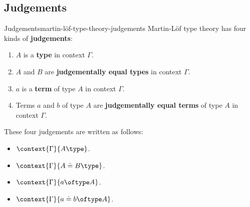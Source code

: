 \subsection{Judgements}\label{subsection-martin-löf-type-theory-judgements}
\begin{definition}{Judgements}{martin-löf-type-theory-judgements}%
    Martin-Löf type theory has four kinds of \textbf{judgements}:
    \begin{enumerate}
        \item\label{martin-löf-type-theory-being-a-type}$A$ is a \textbf{type} in context $\Gamma$.
        \item\label{martin-löf-type-theory-being-judgementally-equal-types}$A$ and $B$ are \textbf{judgementally equal types} in context $\Gamma$.
        \item\label{martin-löf-type-theory-being-a-term}$a$ is a \textbf{term} of type $A$ in context $\Gamma$.
        \item\label{martin-löf-type-theory-being-judgementally-equal-terms}Terms $a$ and $b$ of type $A$ are \textbf{judgementally equal terms} of type $A$ in context $\Gamma$.
    \end{enumerate}
    These four judgements are written as follows:
    \begin{itemize}
        \item $\context{\Gamma}{A\type}$.
        \item $\context{\Gamma}{A\doteq B\type}$.
        \item $\context{\Gamma}{a\oftype A}$.
        \item $\context{\Gamma}{a\doteq b\oftype A}$.
    \end{itemize}
\end{definition}
